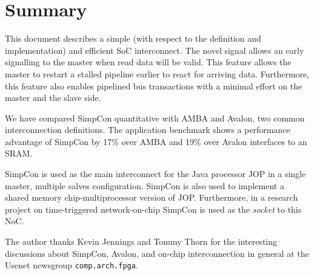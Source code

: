 \section{Summary}

This document describes a simple (with respect to the definition and
implementation) and efficient SoC interconnect. The novel signal
 allows an early signalling to the master when read
data will be valid. This feature allows the master to restart a
stalled pipeline earlier to react for arriving data. Furthermore,
this feature also enables pipelined bus transactions with a minimal
effort on the master and the slave side.

We have compared SimpCon quantitative with AMBA and Avalon, two
common interconnection definitions. The application benchmark shows
a performance advantage of SimpCon by 17\% over AMBA and 19\% over
Avalon interfaces to an SRAM.

SimpCon is used as the main interconnect for the Java processor JOP
in a single master, multiple salves configuration. SimpCon is also
used to implement a shared memory chip-multiprocessor version of
JOP. Furthermore, in a research project on time-triggered
network-on-chip \cite{jop:ttnoc} SimpCon is used as the
\emph{socket} to this NoC.

The author thanks Kevin Jennings and Tommy Thorn for the interesting
discussions about SimpCon, Avalon, and on-chip interconnection in
general at the Usenet newsgroup \texttt{comp.arch.fpga}.
